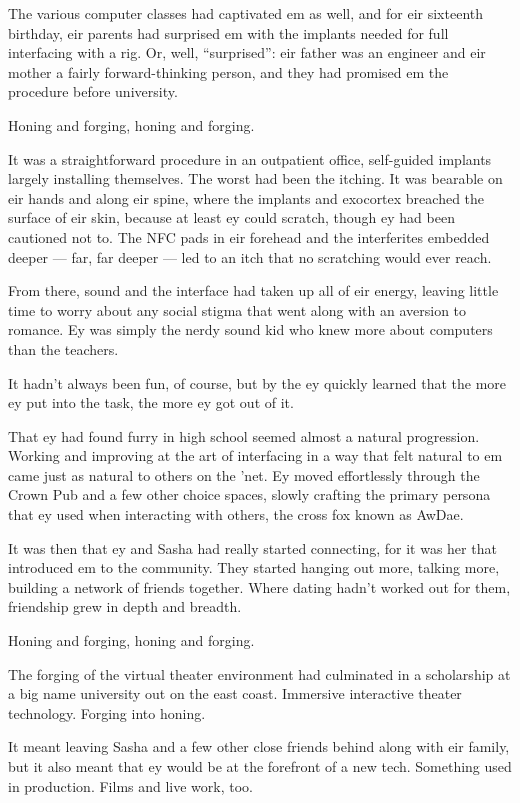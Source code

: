 The various computer classes had captivated em as well, and for eir sixteenth birthday, eir parents had surprised em with the implants needed for full interfacing with a rig. Or, well, ``surprised'': eir father was an engineer and eir mother a fairly forward-thinking person, and they had promised em the procedure before university.

Honing and forging, honing and forging.

It was a straightforward procedure in an outpatient office, self-guided implants largely installing themselves. The worst had been the itching. It was bearable on eir hands and along eir spine, where the implants and exocortex breached the surface of eir skin, because at least ey could scratch, though ey had been cautioned not to. The NFC pads in eir forehead and the interferites embedded deeper --- far, far deeper --- led to an itch that no scratching would ever reach.

From there, sound and the interface had taken up all of eir energy, leaving little time to worry about any social stigma that went along with an aversion to romance. Ey was simply the nerdy sound kid who knew more about computers than the teachers.

It hadn't always been fun, of course, but by the ey quickly learned that the more ey put into the task, the more ey got out of it.

That ey had found furry in high school seemed almost a natural progression. Working and improving at the art of interfacing in a way that felt natural to em came just as natural to others on the 'net. Ey moved effortlessly through the Crown Pub and a few other choice spaces, slowly crafting the primary persona that ey used when interacting with others, the cross fox known as AwDae.

It was then that ey and Sasha had really started connecting, for it was her that introduced em to the community. They started hanging out more, talking more, building a network of friends together. Where dating hadn't worked out for them, friendship grew in depth and breadth.

Honing and forging, honing and forging.

The forging of the virtual theater environment had culminated in a scholarship at a big name university out on the east coast. Immersive interactive theater technology. Forging into honing.

It meant leaving Sasha and a few other close friends behind along with eir family, but it also meant that ey would be at the forefront of a new tech. Something used in production. Films and live work, too.

